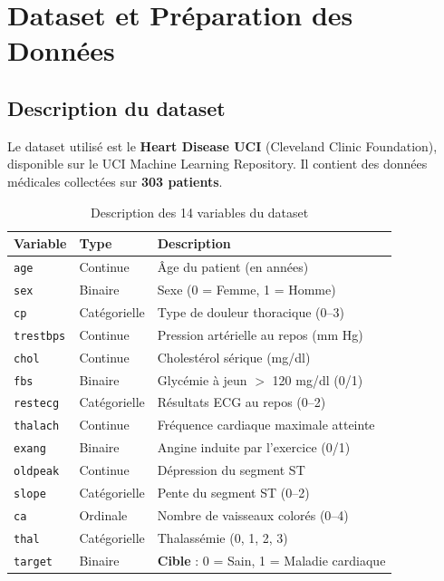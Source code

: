\documentclass[12pt,a4paper]{article}
\newcommand{\feat}[1]{\texttt{\textcolor{medblue}{#1}}}
\begin{document}
	\section{Dataset et Préparation des Données}

		\subsection{Description du dataset}

		Le dataset utilisé est le \textbf{Heart Disease UCI} (Cleveland Clinic Foundation), disponible sur le UCI Machine Learning Repository. Il contient des données médicales collectées sur \textbf{303 patients}.
		\begin{table}[H]
			\centering
			\caption{Description des 14 variables du dataset}
			\label{tab:variables}
			\small
			\begin{tabularx}{\textwidth}{llX}
				\toprule
				\textbf{Variable} & \textbf{Type} & \textbf{Description} \\
				\midrule
				\feat{age}      & Continue   & Âge du patient (en années) \\
				\feat{sex}      & Binaire    & Sexe (0 = Femme, 1 = Homme) \\
				\feat{cp}       & Catégorielle & Type de douleur thoracique (0–3) \\
				\feat{trestbps} & Continue   & Pression artérielle au repos (mm Hg) \\
				\feat{chol}     & Continue   & Cholestérol sérique (mg/dl) \\
				\feat{fbs}      & Binaire    & Glycémie à jeun $>$ 120 mg/dl (0/1) \\
				\feat{restecg}  & Catégorielle & Résultats ECG au repos (0–2) \\
				\feat{thalach}  & Continue   & Fréquence cardiaque maximale atteinte \\
				\feat{exang}    & Binaire    & Angine induite par l'exercice (0/1) \\
				\feat{oldpeak}  & Continue   & Dépression du segment ST \\
				\feat{slope}    & Catégorielle & Pente du segment ST (0–2) \\
				\feat{ca}       & Ordinale   & Nombre de vaisseaux colorés (0–4) \\
				\feat{thal}     & Catégorielle & Thalassémie (0, 1, 2, 3) \\
				\feat{target}   & Binaire    & \textbf{Cible} : 0 = Sain, 1 = Maladie cardiaque \\
				\bottomrule
			\end{tabularx}
		\end{table}
\end{document}

